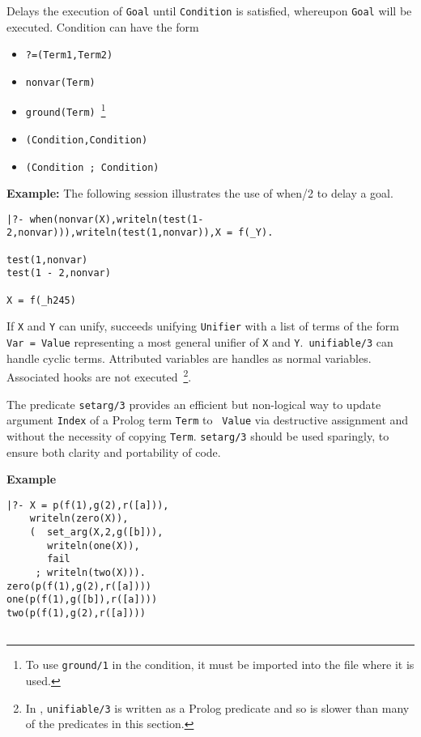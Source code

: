 \begin{description}
%
Delays the execution of {\tt Goal} until {\tt Condition} is satisfied,
whereupon {\tt Goal} will be executed.  Condition can have the form
\begin{itemize}
\item {\tt ?=(Term1,Term2)}
\item {\tt nonvar(Term)}
\item {\tt ground(Term)}~\footnote{To use {\tt ground/1} in the
condition, it must be imported into the file where it is used.}
\item {\tt (Condition,Condition)}
\item {\tt (Condition ; Condition)}
\end{itemize}

{\bf Example:} The following session illustrates the use of when/2 to
delay a goal.
%
\begin{small}
\begin{verbatim}
|?- when(nonvar(X),writeln(test(1-2,nonvar))),writeln(test(1,nonvar)),X = f(_Y).

test(1,nonvar)
test(1 - 2,nonvar)

X = f(_h245)
\end{verbatim}
\end{small}

%
If {\tt X} and {\tt Y} can unify, succeeds unifying {\tt Unifier} with
a list of terms of the form {\tt Var = Value} representing a most
general unifier of {\tt X} and {\tt Y}.\  {\tt unifiable/3} can handle
cyclic terms. Attributed variables are handles as normal
variables. Associated hooks are not executed~\footnote{In \version ,
  {\tt unifiable/3} is written as a Prolog predicate and so is slower
  than many of the predicates in this section.}.

%
The predicate {\tt setarg/3} provides an efficient but non-logical way
to update argument {\tt Index} of a Prolog term {\tt Term} to {\tt
  Value} via destructive assignment and without the necessity of
copying {\tt Term}.  {\tt setarg/3} should be used sparingly, to
ensure both clarity and portability of code.

{\bf Example}
{\small
\begin{verbatim}
|?- X = p(f(1),g(2),r([a])),
    writeln(zero(X)),
    (  set_arg(X,2,g([b])),
       writeln(one(X)),
       fail
     ; writeln(two(X))).
zero(p(f(1),g(2),r([a])))
one(p(f(1),g([b]),r([a])))
two(p(f(1),g(2),r([a])))


\end{verbatim}}
\end{description}
